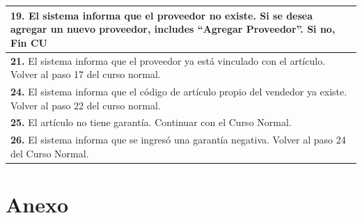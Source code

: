 \documentclass[12pt]{extarticle}
\begin{document}
\begin{spacing}{1.2}
\begin{longtable}{ |p{8cm}|p{8cm}| }
		\hline
		\multicolumn{2}{|p{16cm}|}{\textbf{19. }El sistema informa que el proveedor no existe. Si se desea agregar un nuevo proveedor, includes ``Agregar Proveedor''. Si no, Fin CU}\\
		\hline
		\multicolumn{2}{|p{16cm}|}{\textbf{21. }El sistema informa que el proveedor ya está vinculado con el artículo. Volver al paso 17 del curso normal.}\\
		\hline
		\multicolumn{2}{|p{16cm}|}{\textbf{24. }El sistema informa que el código de artículo propio del vendedor ya existe. Volver al paso 22 del curso normal.}\\
		\hline
		\multicolumn{2}{|p{16cm}|}{\textbf{25. }El artículo no tiene garantía. Continuar con el Curso Normal.}\\
		\hline
		\multicolumn{2}{|p{16cm}|}{\textbf{26. }El sistema informa que se ingresó una garantía negativa. Volver al paso 24 del Curso Normal.}\\
		\hline
	\end{longtable}


























	\end{spacing}

	\pagebreak

	\section{Anexo}
\end{document}

